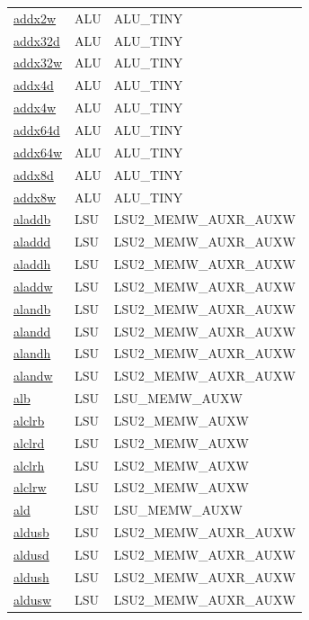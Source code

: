 \begin{small}
\begin{longtable}[l]{l l l}
\hyperlink{lvx.addx2w}{addx2w} & ALU & ALU\_TINY \\ 
\hyperlink{lvx.addx32d}{addx32d} & ALU & ALU\_TINY \\ 
\hyperlink{lvx.addx32w}{addx32w} & ALU & ALU\_TINY \\ 
\hyperlink{lvx.addx4d}{addx4d} & ALU & ALU\_TINY \\ 
\hyperlink{lvx.addx4w}{addx4w} & ALU & ALU\_TINY \\ 
\hyperlink{lvx.addx64d}{addx64d} & ALU & ALU\_TINY \\ 
\hyperlink{lvx.addx64w}{addx64w} & ALU & ALU\_TINY \\ 
\hyperlink{lvx.addx8d}{addx8d} & ALU & ALU\_TINY \\ 
\hyperlink{lvx.addx8w}{addx8w} & ALU & ALU\_TINY \\ 
\hyperlink{lvx.aladdb}{aladdb} & LSU & LSU2\_MEMW\_AUXR\_AUXW \\ 
\hyperlink{lvx.aladdd}{aladdd} & LSU & LSU2\_MEMW\_AUXR\_AUXW \\ 
\hyperlink{lvx.aladdh}{aladdh} & LSU & LSU2\_MEMW\_AUXR\_AUXW \\ 
\hyperlink{lvx.aladdw}{aladdw} & LSU & LSU2\_MEMW\_AUXR\_AUXW \\ 
\hyperlink{lvx.alandb}{alandb} & LSU & LSU2\_MEMW\_AUXR\_AUXW \\ 
\hyperlink{lvx.alandd}{alandd} & LSU & LSU2\_MEMW\_AUXR\_AUXW \\ 
\hyperlink{lvx.alandh}{alandh} & LSU & LSU2\_MEMW\_AUXR\_AUXW \\ 
\hyperlink{lvx.alandw}{alandw} & LSU & LSU2\_MEMW\_AUXR\_AUXW \\ 
\hyperlink{lvx.alb}{alb} & LSU & LSU\_MEMW\_AUXW \\ 
\hyperlink{lvx.alclrb}{alclrb} & LSU & LSU2\_MEMW\_AUXW \\ 
\hyperlink{lvx.alclrd}{alclrd} & LSU & LSU2\_MEMW\_AUXW \\ 
\hyperlink{lvx.alclrh}{alclrh} & LSU & LSU2\_MEMW\_AUXW \\ 
\hyperlink{lvx.alclrw}{alclrw} & LSU & LSU2\_MEMW\_AUXW \\ 
\hyperlink{lvx.ald}{ald} & LSU & LSU\_MEMW\_AUXW \\ 
\hyperlink{lvx.aldusb}{aldusb} & LSU & LSU2\_MEMW\_AUXR\_AUXW \\ 
\hyperlink{lvx.aldusd}{aldusd} & LSU & LSU2\_MEMW\_AUXR\_AUXW \\ 
\hyperlink{lvx.aldush}{aldush} & LSU & LSU2\_MEMW\_AUXR\_AUXW \\ 
\hyperlink{lvx.aldusw}{aldusw} & LSU & LSU2\_MEMW\_AUXR\_AUXW \\ 

\end{longtable}
\end{small}
